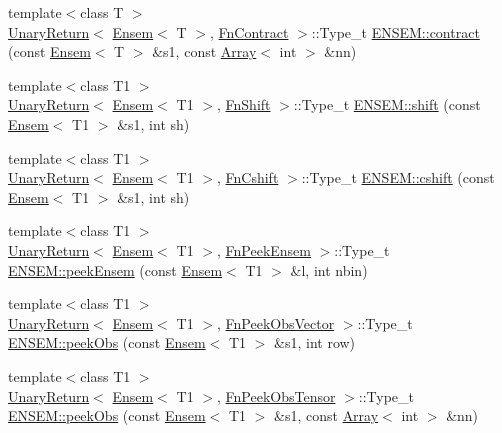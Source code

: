 \begin{DoxyCompactItemize}
{\footnotesize template$<$class T $>$ }\\\mbox{\hyperlink{structENSEM_1_1UnaryReturn}{Unary\+Return}}$<$ \mbox{\hyperlink{classENSEM_1_1Ensem}{Ensem}}$<$ T $>$, \mbox{\hyperlink{structENSEM_1_1FnContract}{Fn\+Contract}} $>$\+::Type\+\_\+t \mbox{\hyperlink{group__eensem_ga1ad11b55c96293cf6f5e776c6c9d0f1b}{E\+N\+S\+E\+M\+::contract}} (const \mbox{\hyperlink{classENSEM_1_1Ensem}{Ensem}}$<$ T $>$ \&s1, const \mbox{\hyperlink{classXMLArray_1_1Array}{Array}}$<$ int $>$ \&nn)
\item 
{\footnotesize template$<$class T1 $>$ }\\\mbox{\hyperlink{structENSEM_1_1UnaryReturn}{Unary\+Return}}$<$ \mbox{\hyperlink{classENSEM_1_1Ensem}{Ensem}}$<$ T1 $>$, \mbox{\hyperlink{structENSEM_1_1FnShift}{Fn\+Shift}} $>$\+::Type\+\_\+t \mbox{\hyperlink{group__eensem_gab3a27539680d018ea7af80f7fe677576}{E\+N\+S\+E\+M\+::shift}} (const \mbox{\hyperlink{classENSEM_1_1Ensem}{Ensem}}$<$ T1 $>$ \&s1, int sh)
\item 
{\footnotesize template$<$class T1 $>$ }\\\mbox{\hyperlink{structENSEM_1_1UnaryReturn}{Unary\+Return}}$<$ \mbox{\hyperlink{classENSEM_1_1Ensem}{Ensem}}$<$ T1 $>$, \mbox{\hyperlink{structENSEM_1_1FnCshift}{Fn\+Cshift}} $>$\+::Type\+\_\+t \mbox{\hyperlink{group__eensem_gaaf138ac5ffa49ae31d5a073a994dc4c3}{E\+N\+S\+E\+M\+::cshift}} (const \mbox{\hyperlink{classENSEM_1_1Ensem}{Ensem}}$<$ T1 $>$ \&s1, int sh)
\item 
{\footnotesize template$<$class T1 $>$ }\\\mbox{\hyperlink{structENSEM_1_1UnaryReturn}{Unary\+Return}}$<$ \mbox{\hyperlink{classENSEM_1_1Ensem}{Ensem}}$<$ T1 $>$, \mbox{\hyperlink{structENSEM_1_1FnPeekEnsem}{Fn\+Peek\+Ensem}} $>$\+::Type\+\_\+t \mbox{\hyperlink{group__eensem_gafcbe1a7f74ec79a0842cfa9aa2ee948c}{E\+N\+S\+E\+M\+::peek\+Ensem}} (const \mbox{\hyperlink{classENSEM_1_1Ensem}{Ensem}}$<$ T1 $>$ \&l, int nbin)
\item 
{\footnotesize template$<$class T1 $>$ }\\\mbox{\hyperlink{structENSEM_1_1UnaryReturn}{Unary\+Return}}$<$ \mbox{\hyperlink{classENSEM_1_1Ensem}{Ensem}}$<$ T1 $>$, \mbox{\hyperlink{structENSEM_1_1FnPeekObsVector}{Fn\+Peek\+Obs\+Vector}} $>$\+::Type\+\_\+t \mbox{\hyperlink{group__eensem_gab81975329321ddb7926b2822e0c53a8e}{E\+N\+S\+E\+M\+::peek\+Obs}} (const \mbox{\hyperlink{classENSEM_1_1Ensem}{Ensem}}$<$ T1 $>$ \&s1, int row)
\item 
{\footnotesize template$<$class T1 $>$ }\\\mbox{\hyperlink{structENSEM_1_1UnaryReturn}{Unary\+Return}}$<$ \mbox{\hyperlink{classENSEM_1_1Ensem}{Ensem}}$<$ T1 $>$, \mbox{\hyperlink{structENSEM_1_1FnPeekObsTensor}{Fn\+Peek\+Obs\+Tensor}} $>$\+::Type\+\_\+t \mbox{\hyperlink{group__eensem_gadb8dd6729310042f809bf94db594bc5b}{E\+N\+S\+E\+M\+::peek\+Obs}} (const \mbox{\hyperlink{classENSEM_1_1Ensem}{Ensem}}$<$ T1 $>$ \&s1, const \mbox{\hyperlink{classXMLArray_1_1Array}{Array}}$<$ int $>$ \&nn)

\end{DoxyCompactItemize}
